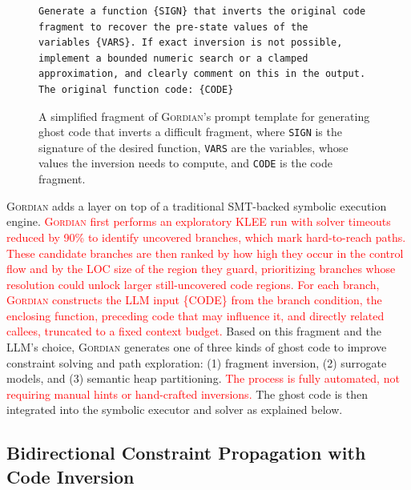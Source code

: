 \documentclass[acmsmall,screen,nonacm]{acmart}
\newcommand{\rev}[1]{\textcolor{red}{#1}}
\newcommand{\rev}[1]{#1}
\newcommand{\projName}{\textsc{Gordian}\xspace}
\theoremstyle{definition}
\begin{document}
\begin{figure}[t]
    \centering
        {\scriptsize
      \begin{tcolorbox}[mybox,title={Ghost Inversion Prompt Template}]
        \begin{verbatim}
Generate a function {SIGN} that inverts the original code fragment to recover the pre-state values of the
variables {VARS}. If exact inversion is not possible, implement a bounded numeric search or a clamped
approximation, and clearly comment on this in the output. The original function code: {CODE}
      \end{verbatim}
      \end{tcolorbox}
        }
\vspace{-2mm}
\caption{\label{fig:inverse_template}A simplified fragment of \projName's prompt template for generating ghost code that inverts a difficult fragment, where \texttt{SIGN} is the signature of the desired function, \texttt{VARS} are the variables, whose values the inversion needs to compute, and \texttt{CODE} is the code fragment.}
\vspace{-2mm}
\end{figure}
\projName{} adds a layer on top of a traditional SMT-backed symbolic execution engine. 
\rev{\projName{} first performs an exploratory KLEE run with solver timeouts reduced by 90\% to identify uncovered branches, which mark hard-to-reach paths. These candidate branches are then ranked by how high they occur in the control flow and by the LOC size of the region they guard, prioritizing branches whose resolution could unlock larger still-uncovered code regions. For each branch, \projName{} constructs the LLM input \{CODE\} from the branch condition, the enclosing function, preceding code that may influence it, and directly related callees, truncated to a fixed context budget.} Based on this fragment
and the LLM's choice, \projName{} generates one of three kinds of ghost code to improve constraint solving and path exploration: (1) fragment inversion, (2) surrogate models, and (3) semantic heap partitioning. 
\rev{The process is fully automated, not requiring manual hints or hand-crafted inversions.} 
The ghost code is then integrated into the symbolic executor and solver as explained below.

\subsection{Bidirectional Constraint Propagation with Code Inversion}
\label{sec:bidirectional}
\end{document}
